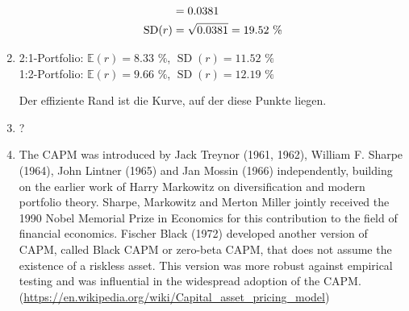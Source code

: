 \documentclass{article}
\newcommand{\E}{\mathbb{E}}
\DeclareMathOperator{\SD}{SD}
\begin{document}
\begin{enumerate}[label=(\alph*)]
\begin{align}
			&= 0.0381 \notag \\
			\SD(r) &= \sqrt{0.0381} = 19.52\text{ \%} \notag
		\end{align}
		\item 2:1-Portfolio: $\E(r)=8.33\text{ \%}$, $\SD(r)=11.52\text{ \%}$ \\
		1:2-Portfolio: $\E(r)=9.66\text{ \%}$, $\SD(r)=12.19\text{ \%}$
		\begin{center}
		\end{center}
		Der effiziente Rand ist die Kurve, auf der diese Punkte liegen.
		\item ?
		\item The CAPM was introduced by Jack Treynor (1961, 1962), William F. Sharpe (1964), John Lintner (1965) and Jan Mossin (1966) independently, building on the earlier work of Harry Markowitz on diversification and modern portfolio theory. Sharpe, Markowitz and Merton Miller jointly received the 1990 Nobel Memorial Prize in Economics for this contribution to the field of financial economics. Fischer Black (1972) developed another version of CAPM, called Black CAPM or zero-beta CAPM, that does not assume the existence of a riskless asset. This version was more robust against empirical testing and was influential in the widespread adoption of the CAPM. (\url{https://en.wikipedia.org/wiki/Capital_asset_pricing_model})
	\end{enumerate}
\end{document}

